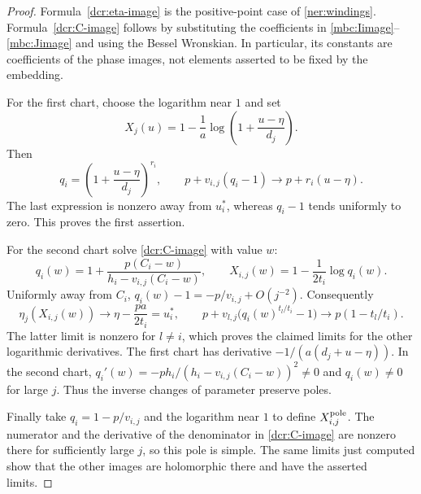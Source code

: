 \documentclass[11pt]{article}
\theoremstyle{definition}
\theoremstyle{remark}
\begin{document}
\begin{proof}
Formula~\eqref{dcr:eta-image} is the positive-point case of
\eqref{ner:windings}. Formula~\eqref{dcr:C-image} follows by substituting
the coefficients in \eqref{mbc:Iimage}--\eqref{mbc:Jimage} and using
the Bessel Wronskian. In particular, its constants are coefficients of
the phase images, not elements asserted to be fixed by the embedding.

For the first chart, choose the logarithm near $1$ and set
\[
 X_j(u)=1-\frac1a\log\left(1+\frac{u-\eta}{d_j}\right).
\]
Then
\[
 q_i=\left(1+\frac{u-\eta}{d_j}\right)^{r_i},\qquad
 p+v_{i,j}(q_i-1)\longrightarrow p+r_i(u-\eta).
\]
The last expression is nonzero away from $u_i^*$, whereas $q_i-1$
tends uniformly to zero. This proves the first assertion.

For the second chart solve \eqref{dcr:C-image} with value $w$:
\[
 q_i(w)=1+\frac{p(C_i-w)}{h_i-v_{i,j}(C_i-w)},\qquad
 X_{i,j}(w)=1-\frac1{2t_i}\log q_i(w).
\]
Uniformly away from $C_i$,
$q_i(w)-1=-p/v_{i,j}+O(j^{-2})$. Consequently
\[
 \eta_j(X_{i,j}(w))\longrightarrow\eta-\frac{pa}{2t_i}=u_i^*,
 \qquad
 p+v_{l,j}\bigl(q_i(w)^{t_l/t_i}-1\bigr)
       \longrightarrow p(1-t_l/t_i).
\]
The latter limit is nonzero for $l\ne i$, which proves the claimed
limits for the other logarithmic derivatives. The first chart has
derivative $-1/(a(d_j+u-\eta))$. In the second chart,
$q_i'(w)=-ph_i/(h_i-v_{i,j}(C_i-w))^2\ne0$ and $q_i(w)\ne0$
for large $j$. Thus the inverse changes of parameter preserve poles.

Finally take $q_i=1-p/v_{i,j}$ and the logarithm near $1$ to define
$X_{i,j}^{\rm pole}$. The numerator and the derivative of the denominator
in \eqref{dcr:C-image} are nonzero there for sufficiently large $j$,
so this pole is simple. The same limits just computed show that the
other images are holomorphic there and have the asserted limits.
\end{proof}
\end{document}
